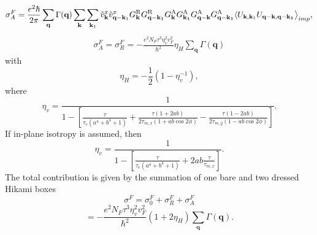 \documentclass[aps,prb,amsmath,amssymb,footinbib,showpacs,twocolumn]{revtex4-2}
\begin{document}
\begin{widetext}
\begin{multline}
     \sigma_{A}^{F}= \frac{e^{2}\hbar}{2\pi}\sum_{\textbf{q}}\Gamma(\textbf{q})\sum_{\textbf{k}}\sum_{\textbf{k}_{1}}\Tilde v_{\textbf{k}}^{x}\Tilde v^{x}_{\textbf{q}-\textbf{k}_{1}}G_{\mathbf{k}}^{\mathrm{R}}G_{\mathbf{q-k_1}}^{\mathrm{R}}G_{\mathbf{k}}^{\mathrm{A}}G_{\mathbf{k_1}}^{\mathrm{A}}G_{\mathbf{q-k}}^{\mathrm{A}} G_{\mathbf{q-k_1}}^{\mathrm{A}}\langle U_{\textbf{k},\mathbf{k}_{1}}U_{\mathbf{q-k},\mathbf{q-k_1}}\bigl \rangle_{imp},
\end{multline}
\begin{align}
     \sigma_{A}^{F}= \sigma_{R}^{F}=  -\frac{ e^{2}N_{F}\tau^{3}\eta^{2}_{v}v^{2}_{F}}{\hbar^{2}}\eta_{H}\sum_{\textbf{q}}\Gamma(\textbf{q})
\end{align}
with 
\begin{equation}
    \eta_{H}=-\frac{1}{2}\left(1-\eta^{-1}_{v}\right),
\end{equation}
where 
\begin{equation}
     \eta_{v}=\frac{1}{1-\left[\frac{\tau}{\tau_{e}(a^{4}+b^{4}+1)}+\frac{\tau(1+2ab)}{2\tau_{m,x}(1+ab\cos2\phi)}-\frac{\tau(1-2ab)}{2\tau_{m,y}(1-ab\cos2\phi)}\right]}.
\end{equation}
If in-plane isotropy is assumed, then 
 \begin{equation}
    \eta_{v}=\frac{1}{1-\left[\frac{\tau}{\tau_{e}(a^{4}+b^{4}+1)}+2ab\frac{\tau}{\tau_{m,x}}\right]}.  
   \end{equation}
The total contribution is given by the summation of one bare and two dressed Hikami boxes
\begin{equation*}
       \sigma^{F}= \sigma_{0}^{F}+ \sigma_{R}^{F} + \sigma_{A}^{F} 
          \end{equation*}
          \begin{equation}
                = -\frac{ e^{2}N_{F}\tau^{3}\eta^{2}_{v}v^{2}_{F}}{\hbar^{2}}(1+2\eta_{H})\sum_{\textbf{q}}\Gamma(\textbf{q}).  
          \end{equation}

\end{widetext}
\end{document}
